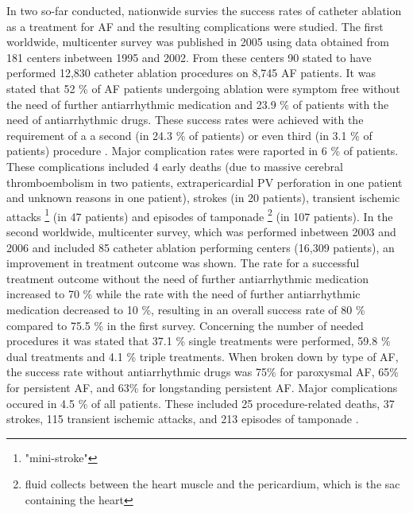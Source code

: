 \documentclass[type=dr, dr=rernat, accentcolor=tud7b,colorbacktitle, bigchapter, openright, twoside, 12pt ]{tudthesis}
\begin{document}
In two so-far conducted, nationwide survies the success rates of catheter ablation as a treatment for AF and the resulting complications 
were studied. The first worldwide, multicenter survey was published in 2005 using data obtained from 181 centers inbetween 1995 and 2002. 
From these centers 90 stated to have performed 12,830 catheter ablation procedures on 8,745 AF patients. 
It was stated that 52 \% of AF patients undergoing ablation were symptom free without the need of further antiarrhythmic medication and 23.9 \% 
of patients with the need of antiarrhythmic drugs. These success rates were achieved with the requirement of a 
a second (in 24.3 \% of patients) or even third (in 3.1 \% of patients) procedure \cite{Cap05}. Major complication rates were raported in 
6 \% of patients. These complications included 4 early deaths (due to massive cerebral thromboembolism in two patients, extrapericardial PV 
perforation in one patient and unknown reasons in one patient), strokes (in 20 patients), transient ischemic attacks \footnote{"mini-stroke"} 
(in 47 patients) and episodes of tamponade \footnote{fluid collects between the heart muscle and the pericardium, which is the sac containing 
the heart} (in 107 patients). 
In the second worldwide, multicenter survey, which was performed inbetween 2003 and 2006 \cite{Cap10} and included 85 catheter ablation 
performing centers (16,309 patients), an improvement in treatment outcome was shown. 
The rate for a successful treatment outcome without the need of further antiarrhythmic medication increased to 
70 \% while the rate with the need of further antiarrhythmic medication decreased to 10 \%, resulting in an overall success rate of 80 \% 
compared to 75.5 \% in the first survey. Concerning the number of needed procedures it was stated that 37.1 \% single treatments were performed, 
59.8 \% dual treatments and 4.1 \% triple treatments. When broken down by type of AF, the success rate without antiarrhythmic drugs was 
75\% for paroxysmal AF, 65\% for persistent AF, and 63\% for longstanding persistent AF. Major complications 
occured in 4.5 \% of all patients. These included 25 procedure-related deaths, 37 strokes, 115 transient ischemic 
attacks, and 213 episodes of tamponade \cite{Cap10}. \newline
\end{document}
